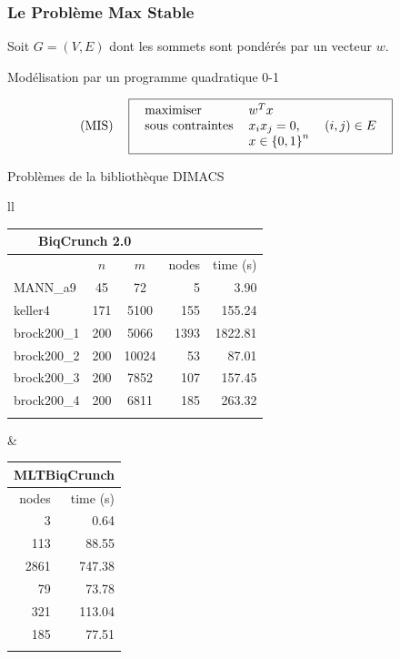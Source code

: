 \documentclass{beamer}
\newcommand{\set}[1]{\left\{ #1 \right\}}
\begin{document}
\begin{frame}
\frametitle{Le Problème Max Stable}

Soit $G=(V,E)$ dont les sommets sont pondérés par un vecteur $w$.


\begin{block}{Modélisation par un programme quadratique 0-1}

\[
\begin{tabular}{ll}
$(\text{MIS})$ &
\fbox{
	\begin{tabular}{lll}
	maximiser 	& $w^Tx$ \\
	sous contraintes 	& $x_ix_j = 0$, & $(i,j)\in E$\\
				& $x \in \set{0,1}^n$
	\end{tabular}
}
\end{tabular}
\]
\end{block}

\begin{block}{Problèmes de la bibliothèque DIMACS}

\begin{tabular}{ll}
{\scriptsize
\begin{tabular}{lccrr}
\multicolumn{3}{c}{\alert{BiqCrunch 2.0}} & & \\
\hline\noalign{\smallskip}
 & $n$ & $m$ & nodes & time (s) \\
\noalign{\smallskip}\hline\noalign{\smallskip}
MANN\_a9 & 45 & 72 & 5 & 3.90 \\
keller4 & 171 & 5100 & 155 & 155.24 \\
brock200\_1 & 200 & 5066 & 1393 & 1822.81 \\
brock200\_2 & 200 & 10024 & 53 & 87.01 \\
brock200\_3 & 200 & 7852 & 107 & 157.45 \\
brock200\_4 & 200 & 6811 & 185 & 263.32 \\
\noalign{\smallskip}\hline
\end{tabular}
}
&
{\scriptsize
\begin{tabular}{rr}
\multicolumn{2}{c}{\alert{MLTBiqCrunch}} \\
\hline\noalign{\smallskip}
 nodes & time (s) \\
\noalign{\smallskip}\hline\noalign{\smallskip}
 3 & 0.64 \\
 113 & 88.55 \\
 2861 & 747.38 \\
 79 & 73.78 \\
 321 & 113.04\\
 185 & 77.51 \\
\noalign{\smallskip}\hline
\end{tabular}
}
\end{tabular}

\end{block}

\end{frame}
\end{document}
